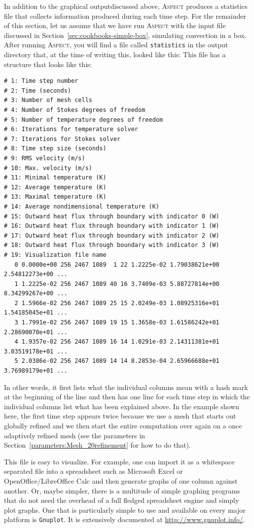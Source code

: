 \documentclass{article}
\newcommand{\aspect}{\textsc{Aspect}}
\begin{document}
In addition to the graphical outputdiscussed above, \aspect{} produces a 
statistics file that collects information produced during each time step.
For the remainder of this section, let us assume that we have run \aspect{}
with the input file discussed in Section~\ref{sec:cookbooks-simple-box},
simulating convection in a box. After running \aspect{}, you will find
a file called \texttt{statistics} in the output directory that, at the time
of writing this, looked like this:
This file has a structure that looks like this:
  \begin{lstlisting}[frame=single,language=ksh]
# 1: Time step number
# 2: Time (seconds)
# 3: Number of mesh cells
# 4: Number of Stokes degrees of freedom
# 5: Number of temperature degrees of freedom
# 6: Iterations for temperature solver
# 7: Iterations for Stokes solver
# 8: Time step size (seconds)
# 9: RMS velocity (m/s)
# 10: Max. velocity (m/s)
# 11: Minimal temperature (K)
# 12: Average temperature (K)
# 13: Maximal temperature (K)
# 14: Average nondimensional temperature (K)
# 15: Outward heat flux through boundary with indicator 0 (W)
# 16: Outward heat flux through boundary with indicator 1 (W)
# 17: Outward heat flux through boundary with indicator 2 (W)
# 18: Outward heat flux through boundary with indicator 3 (W)
# 19: Visualization file name
   0 0.0000e+00 256 2467 1089  1 22 1.2225e-02 1.79038621e+00 2.54812273e+00 ...
   1 1.2225e-02 256 2467 1089 40 16 3.7409e-03 5.88727814e+00 8.34299267e+00 ...
   2 1.5966e-02 256 2467 1089 25 15 2.0249e-03 1.08925316e+01 1.54185045e+01 ...
   3 1.7991e-02 256 2467 1089 19 15 1.3658e-03 1.61586242e+01 2.28690070e+01 ...
   4 1.9357e-02 256 2467 1089 16 14 1.0291e-03 2.14311381e+01 3.03519178e+01 ...
   5 2.0386e-02 256 2467 1089 14 14 8.2853e-04 2.65966688e+01 3.76989179e+01 ... 
  \end{lstlisting}
  
In other words, it first lists what the individual columns mean with a hash
mark at the beginning of the line and then has one line for each time step
in which the individual columns list what has been explained above. In the
example shown here, the first time step appears twice because we use a mesh
that starts out globally refined and we then start the entire computation
over again on a once adaptively refined mesh (see the parameters in 
Section~\ref{parameters:Mesh_20refinement} for how to do that).

This file is easy to visualize. For example, one can import it as a whitespace
separated file into a spreadsheet such as Microsoft Excel or OpenOffice/LibreOffice
Calc and then generate graphs of one column against another. Or, maybe simpler,
there is a multitude of simple graphing programs that do not need the overhead
of a full fledged spreadsheet engine and simply plot graphs. One that is 
particularly simple to use and available on every major platform is \texttt{Gnuplot}.
It is extensively documented at \url{http://www.gnuplot.info/}.
\end{document}
